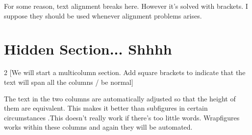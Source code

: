 \documentclass[a4paper]{report}
\begin{document}
{For some reason, text alignment breaks here. However it's solved with brackets. I suppose they should be used whenever alignment problems arises.\\}

\newpage
\section*{Hidden Section... Shhhh}

\begin{multicols}{2}
	[We will start a multicolumn section. 
	Add square brackets to indicate that the text will span all the columns / be normal]
	
	The text in the two columns are automatically adjusted so that the height of them are equivalent. This makes it better than subfigures in certain circumstances .This doesn't really work if there's too little words. Wrapfigures works within these columns and again they will be automated.\\
\end{multicols}

\newpage


\end{document}
